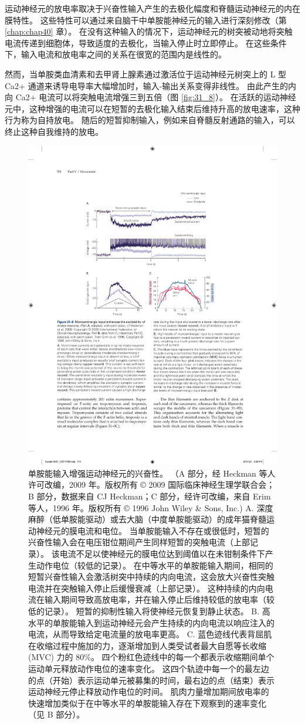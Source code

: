 运动神经元的放电率取决于兴奋性输入产生的去极化幅度和脊髓运动神经元的内在膜特性。
这些特性可以通过来自脑干中单胺能神经元的输入进行深刻修改（第 \ref{chap:chap40} 章）。
在没有这种输入的情况下，运动神经元的树突被动地将突触电流传递到细胞体，导致适度的去极化，当输入停止时立即停止。
在这些条件下，输入电流和放电率之间的关系在很宽的范围内是线性的。


然而，当单胺类血清素和去甲肾上腺素通过激活位于运动神经元树突上的 L 型 Ca2+ 通道来诱导电导率大幅增加时，输入-输出关系变得非线性。
由此产生的内向 Ca2+ 电流可以将突触电流增强三到五倍（图 \ref{fig:31_8}）。
在活跃的运动神经元中，这种增强的电流可以在短暂的去极化输入结束后维持升高的放电速率，这种行为称为自持放电。
随后的短暂抑制输入，例如来自脊髓反射通路的输入，可以终止这种自我维持的放电。


\begin{figure}[htbp]
	\centering
	\includegraphics[width=0.7\linewidth]{chap31/fig_31_8}
	\caption{单胺能输入增强运动神经元的兴奋性。 （A 部分，经 Heckman 等人许可改编，2009 年。版权所有 © 2009 国际临床神经生理学联合会；B 部分，数据来自 CJ Heckman；C 部分，经许可改编，来自 Erim 等人，1996 年。版权所有 © 1996 John Wiley \& Sons, Inc.) A. 深度麻醉（低单胺能驱动）或去大脑（中度单胺能驱动）的成年猫脊髓运动神经元的膜电流和电位。 当单胺能输入不存在或很低时，短暂的兴奋性输入会在电压钳位期间产生同样短暂的突触电流（上部记录）。 该电流不足以使神经元的膜电位达到阈值以在未钳制条件下产生动作电位（较低的记录）。 在中等水平的单胺能输入期间，相同的短暂兴奋性输入会激活树突中持续的内向电流，这会放大兴奋性突触电流并在突触输入停止后缓慢衰减（上部记录）。 这种持续的内向电流在输入期间导致高放电率，并在输入停止后维持较低的放电率（较低的记录）。 短暂的抑制性输入将使神经元恢复到静止状态。 B. 高水平的单胺能输入到运动神经元会产生持续的内向电流以响应注入的电流，从而导致给定电流量的放电率更高。 C. 蓝色迹线代表背屈肌在收缩过程中施加的力，逐渐增加到人类受试者最大自愿等长收缩 (MVC) 力的 80\%。 四个粉红色迹线中的每一个都表示收缩期间单个运动单元释放动作电位的速率变化。 这四个轨迹中每一个的最左边的点（开始）表示运动单元被募集的时间，最右边的点（结束）表示运动神经元停止释放动作电位的时间。 肌肉力量增加期间放电率的快速增加类似于在中等水平的单胺能输入存在下观察到的速率变化（见 B 部分）。}

\end{figure}
